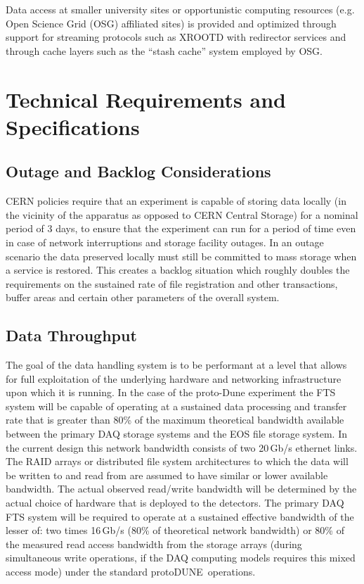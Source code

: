 \documentclass[pdftex,12pt,letter]{article}
\newcommand{\pd}{protoDUNE\ }
\begin{document}
Data access at smaller university sites or opportunistic computing resources (e.g. Open Science Grid (OSG)
affiliated sites) is provided and optimized through support for streaming protocols such as XROOTD with redirector
services and through cache layers such as the “stash cache” system employed by OSG.  

\section{Technical Requirements and Specifications}

\subsection{Outage and Backlog Considerations}
\label{sec:backlog}
CERN policies require that an experiment is capable of storing data locally (in the vicinity of the apparatus as opposed to CERN Central
Storage)  for a nominal period of 3 days, to ensure that the experiment can run for a period of time even in case of network interruptions
and storage facility outages. In an outage scenario the data preserved locally must still be committed to mass storage when a service is restored.
This creates a backlog situation which roughly doubles the requirements on the sustained rate of file registration and other transactions, buffer
areas and certain other parameters of the overall system.


\subsection{Data Throughput}

The goal of the data handling system is to be performant at a level that allows for full exploitation of the underlying hardware and networking infrastructure
upon which  it is running.  In the case of the proto-Dune experiment the FTS system will be capable of operating at a sustained data processing and transfer
rate that is greater than 80\% of the maximum theoretical bandwidth available between the primary DAQ storage systems and the EOS file storage system.
 In the current design this network bandwidth consists of two 20\,Gb/s ethernet links.  The RAID arrays or distributed file system architectures to which the
data will be written to and read from are assumed to have similar or lower available bandwidth.  The actual observed read/write bandwidth will be determined
by the actual choice of hardware that is deployed to the detectors.  The primary DAQ FTS system will be required to operate at a sustained effective bandwidth
of the lesser of: two times 16\,Gb/s (80\% of theoretical network bandwidth) or 80\% of the measured read access bandwidth from the storage arrays
(during simultaneous write operations, if the DAQ computing models requires this mixed access mode) under the standard \pd operations.
\end{document}
